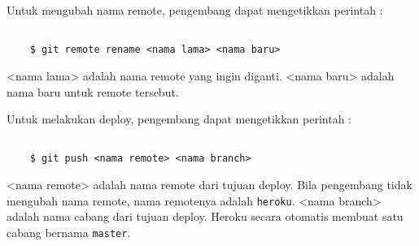 Untuk mengubah nama remote, pengembang dapat mengetikkan perintah :
\begin{lstlisting}

	$ git remote rename <nama lama> <nama baru>

\end{lstlisting}
<nama lama> adalah nama remote yang ingin diganti. <nama baru> adalah nama baru untuk remote tersebut.

Untuk melakukan deploy, pengembang dapat mengetikkan perintah :
\begin{lstlisting}

	$ git push <nama remote> <nama branch>

\end{lstlisting}
<nama remote> adalah nama remote dari tujuan deploy. Bila pengembang tidak mengubah nama remote, nama remotenya adalah \texttt{heroku}. <nama branch> adalah nama cabang dari tujuan deploy. Heroku secara otomatis membuat satu cabang bernama \texttt{master}. 

